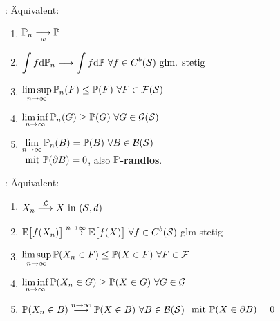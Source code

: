 \documentclass[12pt]{scrartcl}
\begin{document}
\begin{minipage}{0.49\textwidth}
	: Äquivalent:
		\begin{enumerate}[label=(\arabic*)]
		\item $\begin{aligned}
			\P_n\stackrelnew{w}{}{\longrightarrow} \P
		\end{aligned}$
		\item $\begin{aligned}
			\int\limits f\d \P_n\stackrel{}{\longrightarrow}\int\limits f\d \P~\forall f\in C^b(\S)\text{ glm. stetig}
		\end{aligned}$
		\item $\begin{aligned}
			\limsup\limits_{n\to\infty} \P_n(F)\leq \P(F)~\forall F\in\F(\S)
		\end{aligned}$
		\item $\begin{aligned}
			\liminf\limits_{n\to\infty} \P_n(G)\geq \P(G)~\forall G\in\G(\S)
		\end{aligned}$
		\item $\begin{aligned}
			\limn \P_n(B)=\P(B)~\forall B\in\B(\S)
		\end{aligned}$\\ $\mit \P(\partial B)=0$, also \textbf{$\P$-randlos}.
	\end{enumerate}
\end{minipage}
\begin{minipage}{0.49\textwidth}
	: Äquivalent:
		\begin{enumerate}[label=(\arabic*)]
		\item $\begin{aligned}
			X_n\stackrel{\L}{\longrightarrow} X\text{ in }(\S,d)
		\end{aligned}$
		\item $\begin{aligned}
			\E\big[f(X_n)\big]\stackrel{n\to\infty}{\longrightarrow}\E\big[f(X)\big]~\forall f\in C^b(\S)
		\end{aligned}$ glm stetig
		\item $\begin{aligned}
			\limsup\limits_{n\to\infty}\P(X_n\in F)\leq\P(X\in F)~\forall F\in\F
		\end{aligned}$
		\item $\begin{aligned}
			\liminf\limits_{n\to\infty}\P(X_n\in G)\geq\P(X\in G)~\forall G\in\G
		\end{aligned}$
		\item $\begin{aligned}
			\P(X_n\in B)\stackrel{n\to\infty}{\longrightarrow}\P(X\in B)~\forall B\in\B(\S)
		\end{aligned}$ $\mit\P(X\in\partial B)=0$
	\end{enumerate}
\end{minipage}
\end{document}
